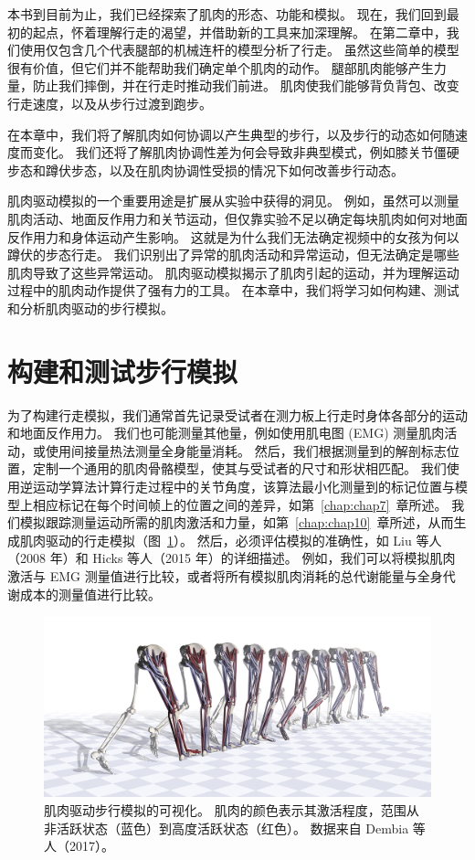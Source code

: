 本书到目前为止，我们已经探索了肌肉的形态、功能和模拟。
现在，我们回到最初的起点，怀着理解行走的渴望，并借助新的工具来加深理解。
在第二章中，我们使用仅包含几个代表腿部的机械连杆的模型分析了行走。
虽然这些简单的模型很有价值，但它们并不能帮助我们确定单个肌肉的动作。
腿部肌肉能够产生力量，防止我们摔倒，并在行走时推动我们前进。
肌肉使我们能够背负背包、改变行走速度，以及从步行过渡到跑步。


在本章中，我们将了解肌肉如何协调以产生典型的步行，以及步行的动态如何随速度而变化。
我们还将了解肌肉协调性差为何会导致非典型模式，例如膝关节僵硬步态和蹲伏步态，以及在肌肉协调性受损的情况下如何改善步行动态。


肌肉驱动模拟的一个重要用途是扩展从实验中获得的洞见。
例如，虽然可以测量肌肉活动、地面反作用力和关节运动，但仅靠实验不足以确定每块肌肉如何对地面反作用力和身体运动产生影响。
这就是为什么我们无法确定视频中的女孩为何以蹲伏的步态行走。
我们识别出了异常的肌肉活动和异常运动，但无法确定是哪些肌肉导致了这些异常运动。
肌肉驱动模拟揭示了肌肉引起的运动，并为理解运动过程中的肌肉动作提供了强有力的工具。
在本章中，我们将学习如何构建、测试和分析肌肉驱动的步行模拟。


\section{构建和测试步行模拟}

为了构建行走模拟，我们通常首先记录受试者在测力板上行走时身体各部分的运动和地面反作用力。
我们也可能测量其他量，例如使用肌电图 (EMG) 测量肌肉活动，或使用间接量热法测量全身能量消耗。
然后，我们根据测量到的解剖标志位置，定制一个通用的肌肉骨骼模型，使其与受试者的尺寸和形状相匹配。
我们使用逆运动学算法计算行走过程中的关节角度，该算法最小化测量到的标记位置与模型上相应标记在每个时间帧上的位置之间的差异，如第~\ref{chap:chap7}~章所述。
我们模拟跟踪测量运动所需的肌肉激活和力量，如第~\ref{chap:chap10}~章所述，从而生成肌肉驱动的行走模拟（图~\ref{fig:11_1}）。
然后，必须评估模拟的准确性，如 Liu 等人（2008 年）和 Hicks 等人（2015 年）的详细描述。
例如，我们可以将模拟肌肉激活与 EMG 测量值进行比较，或者将所有模拟肌肉消耗的总代谢能量与全身代谢成本的测量值进行比较。


\begin{figure}[!htb]
	\centering
	\includegraphics[width=1.0\linewidth]{chap11/11_1}
	\caption{肌肉驱动步行模拟的可视化。
		肌肉的颜色表示其激活程度，范围从非活跃状态（蓝色）到高度活跃状态（红色）。
		数据来自 Dembia 等人（2017）。 \label{fig:11_1}}
\end{figure}


